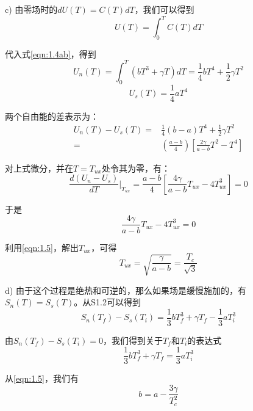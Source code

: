 c) 由零场时的$dU(T)=C(T)dT$，我们可以得到
\begin{equation*}
U(T) =\int_{0}^{T}C(T) dT  \tag{S1.12}
\end{equation*}

代入式\ref{eqn:1.4ab}，得到
\begin{equation*}
U_n(T) =\int_{0}^{T}(bT^3 +\gamma T)dT = \frac{1}{4}bT^4 +\frac{1}{2}\gamma T^2 \tag{S1.13a}
\end{equation*}
\begin{equation*}
U_s(T)=\frac{1}{4}aT^4 \tag{S1.13b}
\end{equation*}

两个自由能的差表示为：
\begin{equation*}
\begin{split}
U_n(T) − U_s(T) =&\frac{1}{4} (b − a)T^4 + \frac{1}{2}\gamma T^2\\
=&\left(\frac{a-b}{4}\right)\left[\frac{2\gamma}{a-b}T^2-T^4\right]
\end{split} \tag{S1.14}
\end{equation*}

对上式微分，并在$T=T_{ux}$处令其为零，有：
\begin{equation*}
\frac{d(U_n-U_s)}{dT}|_{T_{ux}}=\frac{a-b}{4} \left[\frac{4\gamma}{a-b}T_{ux}-4T_{ux}^3\right]=0 \tag{S1.15}
\end{equation*}

于是
\begin{equation*}
\frac{4\gamma}{a-b}T_{ux}-4T_{ux}^3=0 \tag{S1.16}
\end{equation*}

利用\ref{eqn:1.5}，解出$T_{ux}$，可得
\begin{equation*}
T_{ux}=\sqrt{\frac{\gamma}{a-b}}=\frac{T_c}{\sqrt{3}} \tag{1.9}
\end{equation*}

d) 由于这个过程是绝热和可逆的，那么如果场是缓慢施加的，有$S_n(T)=S_s(T)$。从S1.2可以得到
\begin{equation*}
S_n(T_f ) − S_s(T_i) =\frac{1}{3}bT_f^3 +\gamma T_f −\frac{1}{3}aT_i^3 \tag{S1.17}
\end{equation*}

由$S_n(T_f )−S_s(T_i)=0$，我们得到关于$T_f$和$T_i$的表达式
\begin{equation*}
\frac{1}{3}bT_f^3 +\gamma T_f =\frac{1}{3}aT_i^3 \tag{S1.18}
\end{equation*}

从\ref{eqn:1.5}，我们有
\begin{equation*}
b = a − \frac{3\gamma}{T_c^2} \tag{S1.19}
\end{equation*}


